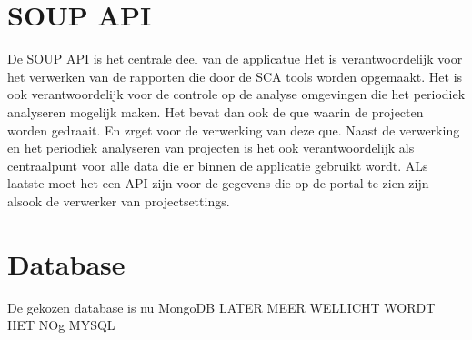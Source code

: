     \section{SOUP API} De SOUP API is het centrale deel van de applicatue Het is verantwoordelijk voor het verwerken van de rapporten die door de SCA tools worden opgemaakt. Het is ook verantwoordelijk voor de controle op de analyse omgevingen die het periodiek analyseren mogelijk maken. Het bevat dan ook de que waarin de projecten worden gedraait. En zrget voor de verwerking van deze que.
    Naast de verwerking en het periodiek analyseren van projecten is het ook verantwoordelijk als centraalpunt voor alle data die er binnen de applicatie gebruikt wordt. ALs laatste moet het een API zijn voor de gegevens die op de portal te zien zijn alsook de verwerker van projectsettings.
    \section{Database} De gekozen database is nu MongoDB LATER MEER WELLICHT WORDT HET NOg MYSQL


